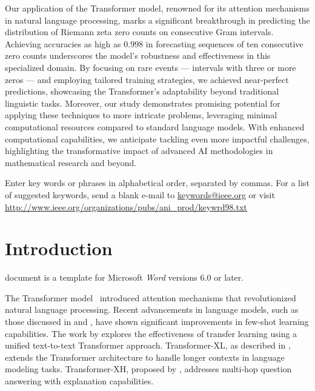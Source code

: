 \documentclass[journal]{IEEEtai}
\begin{document}
\begin{IEEEImpStatement}
Our application of the Transformer model, renowned for its attention mechanisms in natural language processing, marks a significant breakthrough in predicting the distribution of Riemann zeta zero counts on consecutive Gram intervals. Achieving accuracies as high as $0.998$ in forecasting sequences of ten consecutive zero counts underscores the model's robustness and effectiveness in this specialized domain. By focusing on rare events — intervals with three or more zeros — and employing tailored training strategies, we achieved near-perfect predictions, showcasing the Transformer's adaptability beyond traditional linguistic tasks. Moreover, our study demonstrates promising potential for applying these techniques to more intricate problems, leveraging minimal computational resources compared to standard language models. With enhanced computational capabilities, we anticipate tackling even more impactful challenges, highlighting the transformative impact of advanced AI methodologies in mathematical research and beyond.

\end{IEEEImpStatement}

\begin{IEEEkeywords}
Enter key words or phrases in alphabetical order, separated by commas. For a list of suggested keywords, send a blank e-mail to \href{mailto:keywords@ieee.org}{\underline{keywords@ieee.org}} or visit \href{http://www.ieee.org/organizations/pubs/ani_prod/keywrd98.txt}{\underline{http://www.ieee.org/organizations/pubs/ani\_prod/keywrd98.txt}}
\end{IEEEkeywords}



\section{Introduction}

 document is a template for Microsoft {\it Word} versions 6.0 or later. 

The Transformer model~\cite{vaswani2017attention} introduced attention mechanisms that revolutionized natural language processing.
Recent advancements in language models, such as those discussed in \cite{radford2019language} and \cite{brown2020language}, have shown significant improvements in few-shot learning capabilities.
The work by \cite{raffel2019exploring} explores the effectiveness of transfer learning using a unified text-to-text Transformer approach.
Transformer-XL, as described in \cite{dai2019transformerxl}, extends the Transformer architecture to handle longer contexts in language modeling tasks.
Transformer-XH, proposed by \cite{zhang2019transformerxh}, addresses multi-hop question answering with explanation capabilities.
\end{document}
